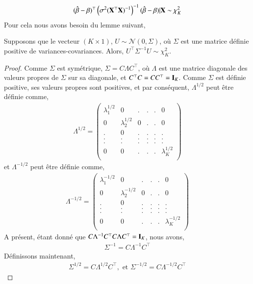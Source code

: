 \documentclass[10pt, reqno]{amsart}
\begin{document}
\begin{align}
(\hat{\beta}-\beta)^\top\left(\sigma^2(\mathbf X^\top\mathbf X)^{-1}
\right)^{-1}
(\hat{\beta}-\beta) | \mathbf X\sim \chi^2_K
\label{eq30}
\end{align}
Pour cela nous avons besoin du lemme suivant,
\begin{lemme}
Supposons que le vecteur $(K\times 1)$, $U\sim\mathcal{N}(0, \Sigma)$, où $\Sigma$ est une matrice définie positive de variances-covariances. Alors, $U^\top\Sigma^{-1}U\sim\chi^2_K$.
\label{le2}
\end{lemme}
\begin{proof}
Comme $\Sigma$ est symétrique, $\Sigma = C\Lambda C^\top$, où $\Lambda$ est une matrice diagonale des valeurs propres de $\Sigma$ sur sa diagonale, et $C^\top C=CC^\top=\mathbf{I}_K$. Comme $\Sigma$ est définie positive, ses valeurs propres sont positives, et par conséquent, $\Lambda^{1/2}$ peut être définie comme,
\begin{align*}
\Lambda^{1/2}=
\left(
\begin{array}{cccccc}
\lambda_1^{1/2}&0&.&.&.&0\\
0&\lambda_2^{1/2}&0&.&.&0\\
.&0&.&.&.&.\\
.&.&.&.&.&.\\
.&.&.&.&.&.\\
0&0&.&.&.&\lambda_K^{1/2}\\
\end{array}
\right)
\end{align*}
et $\Lambda^{-1/2}$ peut être définie comme,
\begin{align*}
\Lambda^{-1/2}=
\left(
\begin{array}{cccccc}
\lambda_1^{-1/2}&0&.&.&.&0\\
0&\lambda_2^{-1/2}&0&.&.&0\\
.&0&.&.&.&.\\
.&.&.&.&.&.\\
.&.&.&.&.&.\\
0&0&.&.&.&\lambda_K^{-1/2}\\
\end{array}
\right)
\end{align*}
A présent, \'etant donné que $C\Lambda^{-1}C^\top C\Lambda C^\top = \mathbf{I}_K$, nous avons,
\begin{align*}
\Sigma^{-1} = C\Lambda^{-1}C^\top
\end{align*}
Définissons maintenant,
\begin{align*}
\Sigma^{1/2} = C\Lambda^{1/2}C^\top, \textrm{ \ et \ } \Sigma^{-1/2} = C\Lambda^{-1/2}C^\top

\end{align*}
\end{proof}
\end{document}
